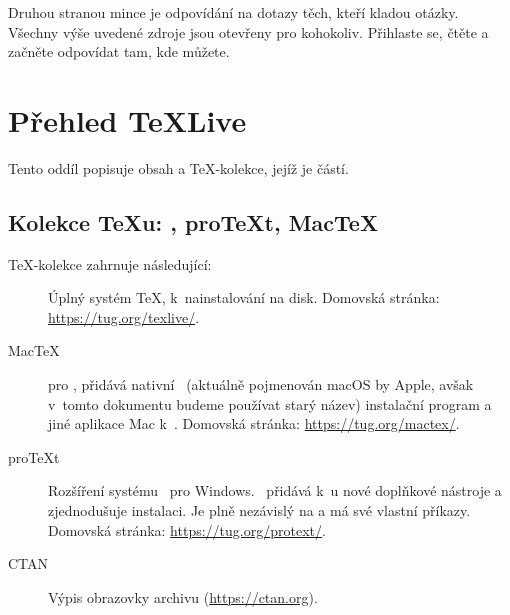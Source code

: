 \documentclass[\classoptions,slovak,english,czech]{\classname}
\newcommand{\ctt}{\url{news:comp.text.tex}}
\newcommand\TKCS{\textsf{\TeX-kolekce}}
\begin{document}
\noindent
Druhou stranou mince je odpovídání na dotazy těch, kteří kladou otázky.
Všechny výše uvedené zdroje jsou otevřeny pro kohokoliv.
Přihlaste se, čtěte a začněte odpovídat tam, kde můžete. 

\section{Přehled \protect\TeX Live}
\label{sec:overview.tl}

Tento oddíl popisuje obsah \TL{} a \TKCS{}, jejíž je částí.



\subsection{Kolekce \protect\TeX{}u: \protect\TL, pro\protect\TeX{}t, Mac\protect\TeX}
\label{sec:tlcoll-dists}

\DVD{} \TKCS{} zahrnuje následující:

\begin{description}
\item [\TL] Úplný systém \TeX{}, k~nainstalování na disk.
Domovská stránka: \url{https://tug.org/texlive/}.

\item [Mac\TeX] pro \MacOSX, přidává nativní \MacOSX\ 
(aktuálně pojmenován macOS by Apple, avšak v~tomto dokumentu budeme používat starý název) 
instalační program a jiné aplikace Mac k~\TL{}. Domovská stránka:
\url{https://tug.org/mactex/}.

\item [pro\TeX{}t] Rozšíření systému \MIKTEX\ pro Windows.
\ProTeXt\ přidává k~\MIKTEX u nové doplňkové nástroje 
a zjednodušuje instalaci. Je plně nezávislý na \TL{} 
a má své vlastní příkazy. 
Domovská stránka: \url{https://tug.org/protext/}.

\item [CTAN] Výpis obrazovky archivu \CTAN{} (\url{https://ctan.org}).

\end{description}
\end{document}
